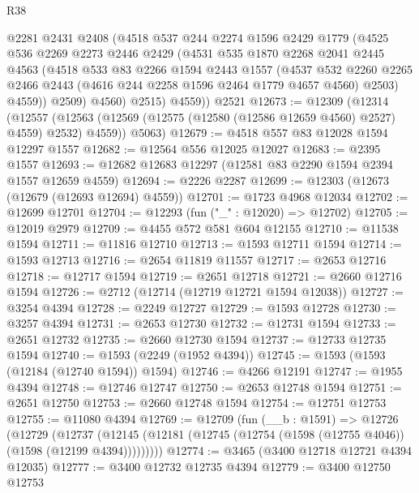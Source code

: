 \begin{lexlean}{R38}
\begin{coremodule}
          @2281
          @2431
          @2408
          (@4518
            @537
            @244
            @2274
            @1596
            @2429
            @1779
            (@4525
              @536
              @2269
              @2273
              @2446
              @2429
              (@4531
                @535
                @1870
                @2268
                @2041
                @2445
                @4563
                (@4518
                  @533
                  @83
                  @2266
                  @1594
                  @2443
                  @1557
                  (@4537
                    @532
                    @2260
                    @2265
                    @2466
                    @2443
                    (@4616 @244 @2258 @1596 @2464 @1779 @4657 @4560)
                    @2503)
                  @4559))
              @2509)
            @4560)
          @2515)
        @4559))
    @2521
@12673 := @12309
    (@12314
      (@12557 (@12563 (@12569 (@12575 (@12580 (@12586 @12659 @4560) @2527) @4559) @2532) @4559))
      @5063)
@12679 := @4518 @557 @83 @12028 @1594 @12297 @1557
@12682 := @12564 @556 @12025 @12027
@12683 := @2395 @1557
@12693 := @12682 @12683 @12297 (@12581 @83 @2290 @1594 @2394 @1557 @12659 @4559)
@12694 := @2226 @2287
@12699 := @12303 (@12673 (@12679 (@12693 @12694) @4559))
@12701 := @1723 @4968 @12034
@12702 := @12699 @12701
@12704 := @12293 (fun ("_" : @12020) => @12702)
@12705 := @12019 @2979
@12709 := @4455 @572 @581 @604 @12155
@12710 := @11538 @1594
@12711 := @11816 @12710
@12713 := @1593 @12711 @1594
@12714 := @1593 @12713
@12716 := @2654 @11819 @11557
@12717 := @2653 @12716
@12718 := @12717 @1594
@12719 := @2651 @12718
@12721 := @2660 @12716 @1594
@12726 := @2712 (@12714 (@12719 @12721 @1594 @12038))
@12727 := @3254 @4394
@12728 := @2249 @12727
@12729 := @1593 @12728
@12730 := @3257 @4394
@12731 := @2653 @12730
@12732 := @12731 @1594
@12733 := @2651 @12732
@12735 := @2660 @12730 @1594
@12737 := @12733 @12735 @1594
@12740 := @1593 (@2249 (@1952 @4394))
@12745 := @1593 (@1593 (@12184 (@12740 @1594)) @1594)
@12746 := @4266 @12191
@12747 := @1955 @4394
@12748 := @12746 @12747
@12750 := @2653 @12748 @1594
@12751 := @2651 @12750
@12753 := @2660 @12748 @1594
@12754 := @12751 @12753
@12755 := @11080 @4394
@12769 := @12709
    (fun (__b : @1591) =>
    @12726
      (@12729
        (@12737 (@12145 (@12181 (@12745 (@12754 (@1598 (@12755 @4046)) (@1598 (@12199 @4394)))))))))
@12774 := @3465 (@3400 @12718 @12721 @4394 @12035)
@12777 := @3400 @12732 @12735 @4394
@12779 := @3400 @12750 @12753

\end{coremodule}
\end{lexlean}
